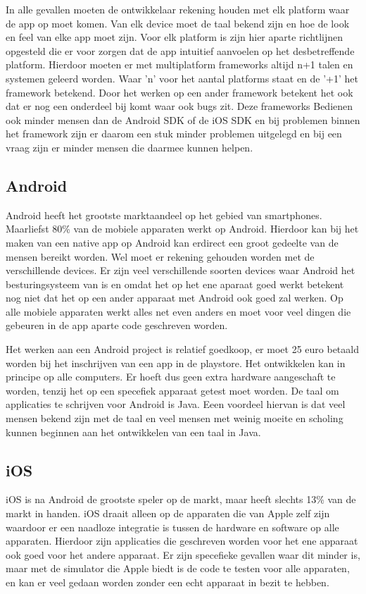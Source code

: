 \documentclass[a4paper,11pt,oneside]{report}
\begin{document}
In alle gevallen moeten de ontwikkelaar rekening houden met elk platform waar de app op moet komen. Van elk device moet de taal bekend zijn en hoe de look en feel van elke app moet zijn. Voor elk platform is zijn hier aparte richtlijnen opgesteld die er voor zorgen dat de app intuitief aanvoelen op het desbetreffende platform. Hierdoor moeten er met multiplatform frameworks altijd n+1 talen en systemen geleerd worden. Waar 'n' voor het aantal platforms staat en de '+1' het framework betekend. Door het werken op een ander framework betekent het ook dat er nog een onderdeel bij komt waar ook bugs zit. Deze frameworks Bedienen ook minder mensen dan de Android SDK of de iOS SDK en bij problemen binnen het framework zijn er daarom een stuk minder problemen uitgelegd en bij een vraag zijn er minder mensen die daarmee kunnen helpen.

\subsection{Android}
Android heeft het grootste marktaandeel op het gebied van smartphones. Maarliefst 80\% van de mobiele apparaten werkt op Android. Hierdoor kan bij het maken van een native app op Android kan erdirect een groot gedeelte van de mensen bereikt worden. Wel moet er rekening gehouden worden met de verschillende devices. Er zijn veel verschillende soorten devices waar Android het besturingsysteem van is en omdat het op het ene aparaat goed werkt betekent nog niet dat het op een ander apparaat met Android ook goed zal werken. Op alle mobiele apparaten werkt alles net even anders en moet voor veel dingen die gebeuren in de app aparte code geschreven worden.

Het werken aan een Android project is relatief goedkoop, er moet 25 euro betaald worden bij het inschrijven van een app in de playstore. Het ontwikkelen kan in principe op alle computers. Er hoeft dus geen extra hardware aangeschaft te worden, tenzij het op een specefiek apparaat getest moet worden. De taal om applicaties te schrijven voor Android is Java. Eeen voordeel hiervan is dat veel mensen bekend zijn met de taal en veel mensen met weinig moeite en scholing kunnen beginnen aan het ontwikkelen van een taal in Java.


\subsection{iOS}
iOS is na Android de grootste speler op de markt, maar heeft slechts 13\% van de markt in handen. iOS draait alleen op de apparaten die van Apple zelf zijn waardoor er een naadloze integratie is tussen de hardware en software op alle apparaten. Hierdoor zijn applicaties die geschreven worden voor het ene apparaat ook goed voor het andere apparaat. Er zijn specefieke gevallen waar dit minder is, maar met de simulator die Apple biedt is de code te testen voor alle apparaten, en kan er veel gedaan worden zonder een echt apparaat in bezit te hebben.
\end{document}
